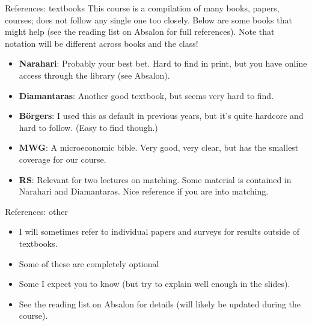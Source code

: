 \documentclass[english,10pt
,aspectratio=169
]{beamer}
\begin{document}
\begin{frame}{References: textbooks}
	This course is a compilation of many books, papers, courses; does not follow any single one too closely. Below are some books that might help (see the reading list on Absalon for full references). Note that notation will be different across books and the class!
	\begin{itemize}%
		\item \textbf{Narahari}: Probably your best bet. Hard to find in print, but you have online access through the library (see Absalon).
		\item \textbf{Diamantaras}: Another good textbook, but seems very hard to find.
		\item \textbf{B\"{o}rgers}: I used this as default in previous years, but it's quite hardcore and hard to follow. (Easy to find though.)
		\item \textbf{MWG}: A microeconomic bible. Very good, very clear, but has the smallest coverage for our course.
		\item \textbf{RS}: Relevant for two lectures on matching. Some material is contained in Narahari and Diamantaras. Nice reference if you are into matching.
	\end{itemize}

\end{frame}


\begin{frame}{References: other}
	\begin{itemize}
		\item I will sometimes refer to individual papers and surveys for results outside of textbooks.
		\item Some of these are completely optional 
		\item Some I expect you to know (but try to explain well enough in the slides).
		\item See the reading list on Absalon for details (will likely be updated during the course).
	\end{itemize}
\end{frame}
\end{document}
